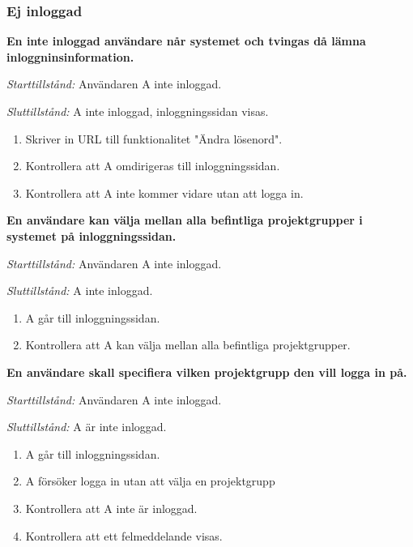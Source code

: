 \documentclass[a4paper]{article}
\begin{document}
\subsubsection{Ej inloggad}
\begin{FT}
\item
\textbf{En inte inloggad användare når systemet och tvingas då lämna inloggninsinformation.}

\emph{Starttillstånd:} Användaren A inte inloggad.

\emph{Sluttillstånd:} A inte inloggad, inloggningssidan visas.

\begin{enumerate}
\item Skriver in URL till funktionalitet "Ändra lösenord".
\item Kontrollera att A omdirigeras till inloggningssidan.
\item Kontrollera att A inte kommer vidare utan att logga in.
\end{enumerate}

\item
\textbf{En användare kan välja mellan alla befintliga projektgrupper i systemet på inloggningssidan.}

\emph{Starttillstånd:} Användaren A inte inloggad.

\emph{Sluttillstånd:} A inte inloggad.

\begin{enumerate}
\item A går till inloggningssidan.
\item Kontrollera att A kan välja mellan alla befintliga projektgrupper.
\end{enumerate}

\item
\textbf{En användare skall specifiera vilken projektgrupp den vill logga in på.}

\emph{Starttillstånd:} Användaren A inte inloggad.

\emph{Sluttillstånd:} A är inte inloggad.

\begin{enumerate}
\item A går till inloggningssidan.
\item A försöker logga in utan att välja en projektgrupp
\item Kontrollera att A inte är inloggad.
\item Kontrollera att ett felmeddelande visas.
\end{enumerate}


\end{FT}
\end{document}
